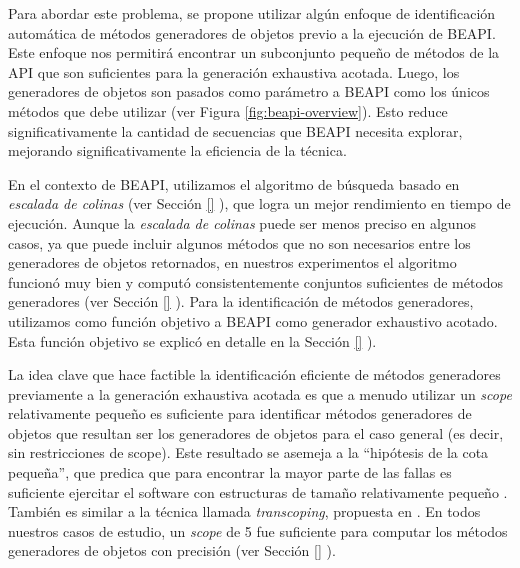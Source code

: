 Para abordar este problema, se propone utilizar algún enfoque de identificación
automática de métodos generadores de objetos previo a la ejecución de BEAPI. 
Este enfoque nos permitirá encontrar un subconjunto pequeño de métodos de la API que son
suficientes para la generación exhaustiva acotada.
Luego, los generadores de objetos son pasados como parámetro a BEAPI como los
únicos métodos que debe utilizar (ver Figura \ref{fig:beapi-overview}). 
Esto reduce significativamente la cantidad de
secuencias que BEAPI necesita explorar, mejorando significativamente la
eficiencia de la técnica.

En el contexto de \textsf{BEAPI}, utilizamos el algoritmo de búsqueda basado en
\emph{escalada de colinas} (ver Sección \ref{} ), que logra un mejor rendimiento en tiempo de
ejecución. 
Aunque la \emph{escalada de colinas} puede ser menos preciso en algunos casos,
ya que puede incluir algunos métodos que no son necesarios entre los generadores
de objetos retornados, en nuestros experimentos el algoritmo funcionó muy bien y
computó consistentemente conjuntos suficientes de métodos generadores (ver
Sección \ref{} ). 
Para la identificación de métodos generadores, utilizamos como función objetivo
a BEAPI como generador exhaustivo acotado. Esta función objetivo se explicó en
detalle en la Sección \ref{} ). 

La idea clave que hace factible la identificación eficiente de métodos generadores
previamente a la generación exhaustiva acotada es que a menudo utilizar un
\emph{scope} relativamente pequeño es suficiente para identificar métodos
generadores de objetos que resultan ser los generadores de objetos para el caso
general (es decir, sin restricciones de scope).
Este resultado se asemeja a la ``hipótesis de la cota pequeña'', que predica que
para encontrar la mayor parte de las fallas es suficiente ejercitar el software
con estructuras de tamaño relativamente pequeño \cite{Andoni02}. También es
similar a la técnica llamada \emph{transcoping}, propuesta en \cite{Rosner13}.
En todos nuestros casos de estudio, un \emph{scope} de 5 fue suficiente para
computar los métodos generadores de objetos con precisión (ver Sección
\ref{} ). 

